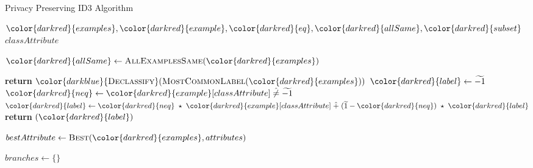 \begin{algorithm}[H]
\caption{Privacy Preserving ID3 Algorithm}\label{a:id3-pp}
\begin{algorithmic}[1]
\renewcommand{\algorithmicrequire}{\textbf{Private Vars:}}
\Require ${\color{darkred}{examples}}, {\color{darkred}{example}}, {\color{darkred}{eq}}, {\color{darkred}{allSame}}, {\color{darkred}{subset}}$
\renewcommand{\algorithmicrequire}{\textbf{Global Vars:}}
\Require $classAttribute$

    \State ${\color{darkred}{allSame}} \gets \textsc{AllExamplesSame}({\color{darkred}{examples}})$

         \State \textbf{return} ${\color{darkblue}{\textsc{Declassify}}}(\textsc{MostCommonLabel}({\color{darkred}{examples}}))$
       \State ${\color{darkred}{label}} \gets \enc{-1}$
       \For{${\color{darkred}{example}} \in {\color{darkred}{examples}}$}
           \State ${\color{darkred}{neq}} \gets {\color{darkred}{example}}[classAttribute] \hneq \enc{-1}$
           \State ${\color{darkred}{label}} \gets {\color{darkred}{neq}} \hmul {\color{darkred}{example}}[classAttribute] \hplus (\enc{1} - {\color{darkred}{neq}}) \hmul {\color{darkred}{label}} $
       \EndFor
       \State \textbf{return} {{}}$({\color{darkred}{label}})$
    \EndIf

    \State $bestAttribute \gets \textsc{Best}({\color{darkred}{examples}}, attributes)$


    \State $branches \gets \{\}$


\end{algorithmic}
\end{algorithm}
